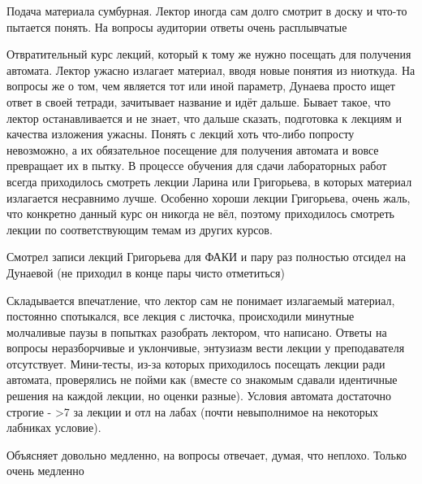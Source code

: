             \begin{commentbox} 
                Подача материала сумбурная. Лектор иногда сам долго смотрит в доску и что-то пытается понять. На вопросы аудитории ответы очень расплывчатые   
            \end{commentbox} 
        
            \begin{commentbox} 
                Отвратительный курс лекций, который к тому же нужно посещать для получения автомата. Лектор ужасно излагает материал, вводя новые понятия из ниоткуда. На вопросы же о том, чем является тот или иной параметр, Дунаева просто ищет ответ в своей тетради, зачитывает название и идёт дальше. Бывает такое, что лектор останавливается и не знает, что дальше сказать, подготовка к лекциям и качества изложения ужасны. Понять с лекций хоть что-либо попросту невозможно, а их обязательное посещение для получения автомата и вовсе превращает их в пытку. В процессе обучения для сдачи лабораторных работ всегда приходилось смотреть лекции Ларина или Григорьева, в которых материал излагается несравнимо лучше. Особенно хороши лекции Григорьева, очень жаль, что конкретно данный курс он никогда не вёл, поэтому приходилось смотреть лекции по соответствующим темам из других курсов. 
            \end{commentbox} 
        
            \begin{commentbox} 
                Смотрел записи лекций Григорьева для ФАКИ и пару раз полностью отсидел на Дунаевой (не приходил в конце пары чисто отметиться) 
            \end{commentbox} 
        
            \begin{commentbox} 
                Складывается впечатление, что лектор сам не понимает излагаемый материал, постоянно спотыкался, все лекция с листочка, происходили минутные молчаливые паузы в попытках разобрать лектором, что написано. Ответы на вопросы неразборчивые и уклончивые, энтузиазм вести лекции у преподавателя отсутствует. Мини-тесты, из-за которых приходилось посещать лекции ради автомата, проверялись не пойми как (вместе со знакомым сдавали идентичные решения на каждой лекции, но оценки разные). Условия автомата достаточно строгие - >7 за лекции и отл на лабах (почти невыполнимое на некоторых лабниках условие). 
            \end{commentbox} 
        
            \begin{commentbox} 
                Объясняет довольно медленно, на вопросы отвечает, думая, что неплохо. Только очень медленно 
            \end{commentbox} 
        
